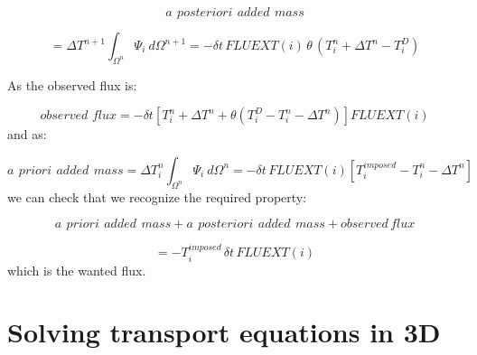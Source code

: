 \begin{equation}
a~\,posteriori~\,added\,~mass
\end{equation}
%

\begin{equation}
=\Delta T^{n+1}\int_{\Omega^{n}}\Psi_{i}~d\Omega^{n+1}=-\delta
t\,FLUEXT(i)\,\theta\,(T_{i}^{n}+\Delta T^{n}-T_{i}^{D})
\end{equation}


As the observed flux is:%

\begin{equation}
observed\,\,flux=-\delta t\left[  T_{i}^{n}+\Delta T^{n}+\theta(T_{i}%
^{D}-T_{i}^{n}-\Delta T^{n})\right]  FLUEXT(i)
\end{equation}
and as:%

\begin{equation}
a~\,priori\,~added~\,mass=\Delta T_{i}^{n}\int_{\Omega^{n}}\Psi_{i}~d\Omega
^{n}=-\delta t\,FLUEXT(i)\left[  T_{i}^{imposed}-T_{i}^{n}-\Delta
T^{n}\right]
\end{equation}
we can check that we recognize the required property:%

\begin{equation}
a~\,priori\,~added\,~mass+a~\,posteriori\,~added\,~mass+observed\,flux
\end{equation}
%

\begin{equation}
=-T_{i}^{imposed}\,\delta t\,FLUEXT(i)
\end{equation}
which is the wanted flux.



\section{Solving transport equations in 3D}\label{sec:advection_schemes}

